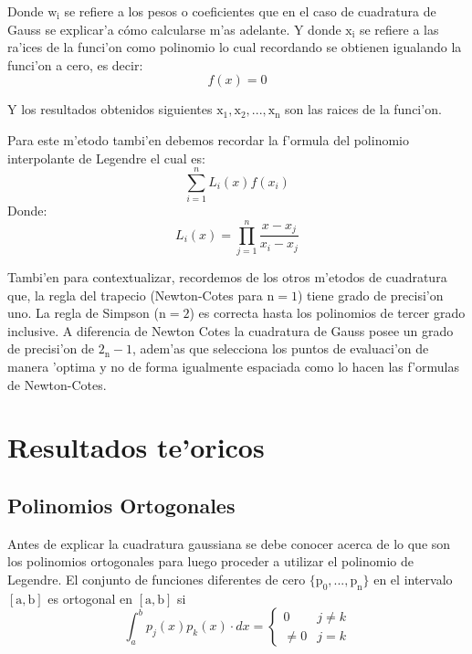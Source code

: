\documentclass[12pt]{article}
\begin{document}
			Donde $\mathrm{w_{i}}$ se refiere a los pesos o coeficientes que en el caso de cuadratura de Gauss se explicar'a cómo calcularse m'as adelante.
			Y donde $\mathrm{x_{i}}$ se refiere a las ra'ices de la funci'on como polinomio lo cual recordando se obtienen igualando la funci'on a cero, es decir:
			\begin{equation}\label{eq:eq2}
				f(x)=0
			\end{equation}
			
			Y los resultados obtenidos siguientes $\mathrm{x_{1}, x_{2},..., x_{n}}$ son las raices de la funci'on.
			
			Para este m'etodo tambi'en debemos recordar la f'ormula del polinomio interpolante de Legendre el cual es:
			\begin{equation}\label{eq:eq3}
				\sum_{i=1}^{n}L_{i}(x)f(x_{i})
			\end{equation} 
			Donde:
			\begin{equation}
				L_{i}(x)=\prod_{j=1}^{n}\frac{x - x_{j}}{x_{i} - x_{j}}
			\end{equation}
			
			Tambi'en para contextualizar, recordemos de los otros m'etodos de cuadratura que, la regla del trapecio (Newton-Cotes para $\mathrm{n=1}$) tiene grado de precisi'on uno. La regla de Simpson ($\mathrm{n=2}$) es correcta hasta los polinomios de tercer grado inclusive. A diferencia de Newton Cotes la cuadratura de Gauss posee un grado de precisi'on de $\mathrm{2_{n}-1}$, adem'as que selecciona los puntos de evaluaci'on de manera 'optima y no de forma igualmente espaciada como lo hacen las f'ormulas de Newton-Cotes.
				
			
		\section*{Resultados te'oricos}
			\subsection*{Polinomios Ortogonales}
				Antes de explicar la cuadratura gaussiana se debe conocer acerca de lo que son los polinomios ortogonales para luego proceder a utilizar el polinomio de Legendre.
				El conjunto de funciones diferentes de cero $\mathrm{\lbrace p_{0}, ..., p_{n}\rbrace}$ en el intervalo $\mathrm{[a,b]}$ es ortogonal en $\mathrm{[a,b]}$ si
				\begin{equation}
					\int_{a}^{b}p_{j}(x)p_{k}(x)\cdot dx = \left\{\begin{array}{lcc}
						0 & j\ne k\\
						\ne 0 & j=k
					\end{array}
					\right.	
				\end{equation}
				
\end{document}
